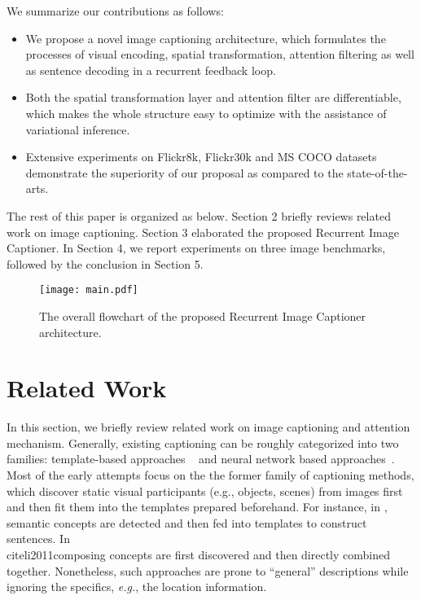 \documentclass[10pt,twocolumn,letterpaper]{article}
\begin{document}
	
	
	We summarize our contributions as follows:
	\begin{itemize}
		\item We propose a novel image captioning architecture, which formulates the processes of visual encoding, spatial transformation, attention filtering as well as sentence decoding in a recurrent feedback loop.
		\item Both the spatial transformation layer and attention filter are differentiable, which makes the whole structure easy to optimize with the assistance of variational inference.
		\item Extensive experiments on Flickr8k, Flickr30k and MS COCO datasets demonstrate the superiority of our proposal as compared to the state-of-the-arts.
	\end{itemize}
	
	The rest of this paper is organized as below. Section 2 briefly reviews related work on image captioning. Section 3 elaborated the proposed Recurrent Image Captioner. In Section 4, we report experiments on three image benchmarks, followed by the conclusion in Section 5.
	
	
	
	\begin{figure*}[t]
		\begin{center}
			\texttt{[image: main.pdf]}
		\end{center}
		\caption{The overall flowchart of the proposed Recurrent Image Captioner architecture.
		}
		\label{fig:main}
	\end{figure*}
	
	\section{Related Work}
	In this section, we briefly review related work on image captioning and attention mechanism. Generally, existing captioning can be roughly categorized into two families: template-based approaches ~\cite{elliott2013image, kuznetsova2012collective} and neural network based approaches~\cite{karpathy2015deep,karpathy2014deep,xu2015show}. Most of the early attempts focus on the the former family of captioning methods, which discover static visual participants (e.g., objects, scenes) from images first and then fit them into the templates prepared beforehand. For instance, in \cite{farhadi2010every, kulkarni2011baby}, semantic concepts are detected and then fed into templates to construct sentences. In~\\cite{li2011composing} concepts are first discovered and then directly combined together. Nonetheless, such approaches are prone to ``general'' descriptions while ignoring the specifics, \emph{e.g.}, the location information.
	
\end{document}

